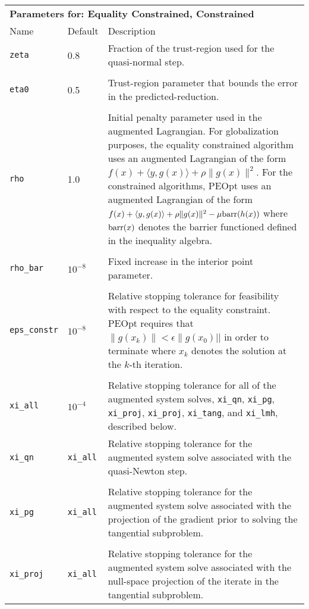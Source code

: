 \documentclass{report}
\begin{document}
\begin{longtable}{llp{}}
\\
\multicolumn{3}{p{\textwidth}}{\bf Parameters for: Equality Constrained, Constrained}\\
Name & Default & Description\\
\texttt{zeta} & 0.8 & Fraction of the trust-region used for the quasi-normal step.\\
\\
\texttt{eta0} & 0.5 & Trust-region parameter that bounds the error in the predicted-reduction.\\
\\
\texttt{rho} & 1.0 & Initial penalty parameter used in the augmented Lagrangian.  For globalization purposes, the equality constrained algorithm uses an augmented Lagrangian of the form $f(x)+\langle y,g(x)\rangle+\rho\|g(x)\|^2$.  For the constrained algorithms, PEOpt uses an augmented Lagrangian of the form $f(x)+\langle y,g(x)\rangle+\rho\|g(x)\|^2-\mu \textnormal{barr}(h(x))$ where $\textnormal{barr}(x)$ denotes the barrier functioned defined in the inequality algebra.\\
\\
\texttt{rho\_bar} & $10^{-8}$ & Fixed increase in the interior point parameter.\\
\\
\texttt{eps\_constr} & $10^{-8}$ & Relative stopping tolerance for feasibility with respect to the equality constraint.  PEOpt requires that $\|g(x_k)\|<\epsilon\|g(x_0)||$ in order to terminate where $x_k$ denotes the solution at the $k$-th iteration.\\
\\
\texttt{xi\_all} & $10^{-4}$ & Relative stopping tolerance for all of the augmented system solves, \texttt{xi\_qn}, \texttt{xi\_pg}, \texttt{xi\_proj}, \texttt{xi\_proj}, \texttt{xi\_tang}, and \texttt{xi\_lmh}, described below.
\\
\texttt{xi\_qn} & \texttt{xi\_all} & Relative stopping tolerance for the augmented system solve associated with the quasi-Newton step.\\
\\
\texttt{xi\_pg} & \texttt{xi\_all} & Relative stopping tolerance for the augmented system solve associated with the projection of the gradient prior to solving the tangential subproblem.\\
\\
\texttt{xi\_proj} & \texttt{xi\_all} & Relative stopping tolerance for the augmented system solve associated with the null-space projection of the iterate in the tangential subproblem.\\ 

\end{longtable}
\end{document}
